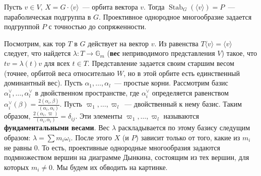 \documentclass[a4paper]{article}
\DeclareMathOperator{\Stab}{Stab}
\newcommand{\term}{\textbf}
\theoremstyle{definition}
\newcommand{\la}{\langle}
\newcommand{\ra}{\rangle}
\begin{document}
Пусть $v\in V$, $X=G\cdot\la v\ra$~--- орбита вектора
$v$. Тогда $\Stab_G(\la v\ra)=P$~--- параболическая подгруппа
в $G$. Проективное однородное многообразие задается подгруппой $P$ с
точностью до сопряженности.

Посмотрим, как тор $T$ в $G$ действует на вектор $v$. Из равенства
$T\la v\ra=\la v\ra$ следует, что найдется $\lambda\colon T\to\mathbb
G_m$ (\term{вес} неприводимого представления $V$) такое, что
$tv=\lambda(t)v$ для всех $t\in T$. Представление задается своим старшим весом
(точнее, орбитой веса относительно $W$, но в этой орбите есть
единственный доминантный вес). %
Пусть $\alpha_1,\dots,\alpha_l$~--- простые корни.
Рассмотрим базис $\alpha_1^\vee,\dots,\alpha_l^\vee$
в двойственном пространстве, где $\alpha_i^\vee$ определяется
равенством
$\alpha_i^\vee(\beta) = \frac{2(\alpha_i,\beta)}{(\alpha_i,\alpha_i)}$.
Пусть $\varpi_1,\dots,\varpi_l$~--- двойственный к нему базис.
Таким образом,
$\frac{2(\alpha_i,\varpi)}{(\alpha_i,\alpha_i)} = \delta_{ij}$.
Эти элементы $\varpi_1,\dots,\varpi_l$ называются
\term{фундаментальными весами}.
Вес $\lambda$ раскладывается по этому базису следущим образом:
$\lambda = \sum m_i\omega_i$.
После этого $X$ (и $P$) зависит только от того, какие из $m_i$ не равны $0$.
То есть, проективные однородные многообразия задаются подмножеством
вершин на диаграмме Дынкина, состоящим из тех вершин, для которых
$m_i\neq 0$.
Мы будем их обводить на картинке.
\end{document}
